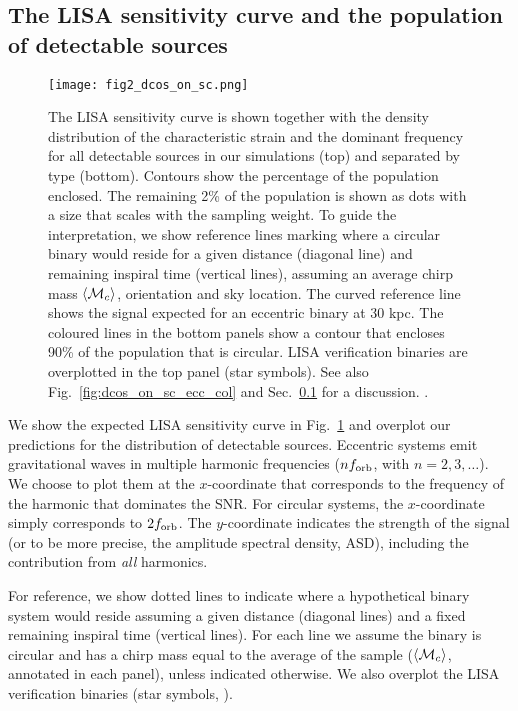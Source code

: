 \subsection{The LISA sensitivity curve and the population of detectable sources}\label{sec:dcos_on_sc}
\begin{figure*}[p]
    \centering
    \texttt{[image: fig2\_dcos\_on\_sc.png]}
    \caption{The LISA sensitivity curve is shown together with the density distribution of the characteristic strain and the dominant frequency for all detectable sources in our simulations (top) and separated by type (bottom). Contours show the percentage of the population enclosed. The remaining 2\% of the population is shown as dots with a size that scales with the sampling weight. To guide the interpretation, we show reference lines marking where a circular binary would reside for a given distance (diagonal line) and remaining inspiral time (vertical lines), assuming an average chirp mass $\left\langle\mathcal{M}_c\right\rangle$, orientation and sky location. The curved reference line shows the signal expected for an eccentric binary at 30 kpc. The coloured lines in the bottom panels show a contour that encloses 90\% of the population that is circular. LISA verification binaries are overplotted in the top panel (star symbols).  See also Fig.~\ref{fig:dcos_on_sc_ecc_col} and Sec.~\ref{sec:dcos_on_sc} for a discussion. \href{https://github.com/TomWagg/detecting-DCOs-in-LISA/blob/main/paper/figures/fig2_dcos_on_sc.png}{\faFileImage} \href{https://github.com/TomWagg/detecting-DCOs-in-LISA/blob/main/paper/figure_notebooks/sensitivity_curve.ipynb}{\faBook}.}
    \label{fig:dcos_on_sc}
\end{figure*}
We show the expected LISA sensitivity curve \citep{Robson+2019} in Fig.~\ref{fig:dcos_on_sc} and overplot our predictions for the distribution of detectable sources. Eccentric systems emit gravitational waves in multiple harmonic frequencies ($n f_{\rm orb}$, with $n = 2, 3, \dots $). We choose to plot them at the $x$-coordinate that corresponds to the frequency of the harmonic that dominates the SNR. For circular systems, the $x$-coordinate simply corresponds to $2 f_{\rm orb}$. The $y$-coordinate indicates the strength of the signal (or to be more precise, the amplitude spectral density, ASD), including the contribution from \textit{all} harmonics.

For reference, we show dotted lines to indicate where a hypothetical binary system would reside assuming a given distance (diagonal lines) and a fixed remaining inspiral time (vertical lines). For each line we assume the binary is circular and has a chirp mass equal to the average of the sample ($\left\langle\mathcal{M}_c\right\rangle$, annotated in each panel), unless indicated otherwise. We also overplot the LISA verification binaries (star symbols, \citealt{Kupfer+2018}).

